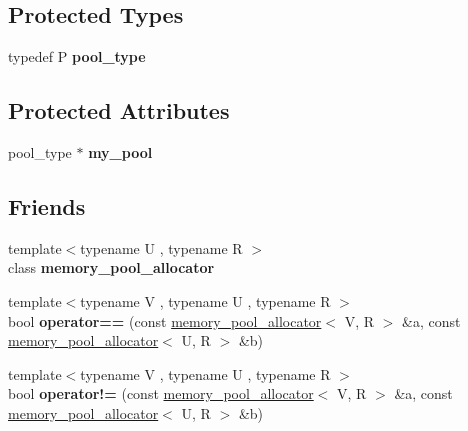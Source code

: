 \subsection*{Protected Types}
\begin{DoxyCompactItemize}
\item 
\hypertarget{classtbb_1_1interface6_1_1memory__pool__allocator_aecd858782faee0fb5fa707671cfc49aa}{}typedef P {\bfseries pool\+\_\+type}\label{classtbb_1_1interface6_1_1memory__pool__allocator_aecd858782faee0fb5fa707671cfc49aa}

\end{DoxyCompactItemize}
\subsection*{Protected Attributes}
\begin{DoxyCompactItemize}
\item 
\hypertarget{classtbb_1_1interface6_1_1memory__pool__allocator_a0fbd737811d556f1d2898d3722e85f32}{}pool\+\_\+type $\ast$ {\bfseries my\+\_\+pool}\label{classtbb_1_1interface6_1_1memory__pool__allocator_a0fbd737811d556f1d2898d3722e85f32}

\end{DoxyCompactItemize}
\subsection*{Friends}
\begin{DoxyCompactItemize}
\item 
\hypertarget{classtbb_1_1interface6_1_1memory__pool__allocator_a6c34ee2e5a57845f050b507cc516a005}{}{\footnotesize template$<$typename U , typename R $>$ }\\class {\bfseries memory\+\_\+pool\+\_\+allocator}\label{classtbb_1_1interface6_1_1memory__pool__allocator_a6c34ee2e5a57845f050b507cc516a005}

\item 
\hypertarget{classtbb_1_1interface6_1_1memory__pool__allocator_ac8c26a64f4e012f2a9cf6035cf029905}{}{\footnotesize template$<$typename V , typename U , typename R $>$ }\\bool {\bfseries operator==} (const \hyperlink{classtbb_1_1interface6_1_1memory__pool__allocator}{memory\+\_\+pool\+\_\+allocator}$<$ V, R $>$ \&a, const \hyperlink{classtbb_1_1interface6_1_1memory__pool__allocator}{memory\+\_\+pool\+\_\+allocator}$<$ U, R $>$ \&b)\label{classtbb_1_1interface6_1_1memory__pool__allocator_ac8c26a64f4e012f2a9cf6035cf029905}

\item 
\hypertarget{classtbb_1_1interface6_1_1memory__pool__allocator_a2f7230e5bc817e7512e18b5311b3371b}{}{\footnotesize template$<$typename V , typename U , typename R $>$ }\\bool {\bfseries operator!=} (const \hyperlink{classtbb_1_1interface6_1_1memory__pool__allocator}{memory\+\_\+pool\+\_\+allocator}$<$ V, R $>$ \&a, const \hyperlink{classtbb_1_1interface6_1_1memory__pool__allocator}{memory\+\_\+pool\+\_\+allocator}$<$ U, R $>$ \&b)\label{classtbb_1_1interface6_1_1memory__pool__allocator_a2f7230e5bc817e7512e18b5311b3371b}

\end{DoxyCompactItemize}


